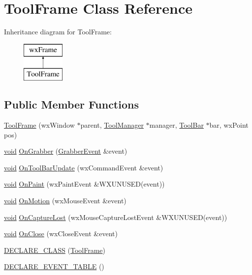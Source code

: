 \hypertarget{class_tool_frame}{}\section{Tool\+Frame Class Reference}
\label{class_tool_frame}
Inheritance diagram for Tool\+Frame\+:\begin{figure}[H]
\begin{center}
\leavevmode
\includegraphics[height=2.000000cm]{class_tool_frame}
\end{center}
\end{figure}
\subsection*{Public Member Functions}
\begin{DoxyCompactItemize}
\item 
\hyperlink{class_tool_frame_a4c897b2a42bbbea14ccd97e038a3283a}{Tool\+Frame} (wx\+Window $\ast$parent, \hyperlink{class_tool_manager}{Tool\+Manager} $\ast$manager, \hyperlink{class_tool_bar}{Tool\+Bar} $\ast$bar, wx\+Point pos)
\item 
\hyperlink{sound_8c_ae35f5844602719cf66324f4de2a658b3}{void} \hyperlink{class_tool_frame_ac08de1b85e3c42fd3f61ed39139256af}{On\+Grabber} (\hyperlink{class_grabber_event}{Grabber\+Event} \&event)
\item 
\hyperlink{sound_8c_ae35f5844602719cf66324f4de2a658b3}{void} \hyperlink{class_tool_frame_af4dc5726e65651cf4be62a5882a3df09}{On\+Tool\+Bar\+Update} (wx\+Command\+Event \&event)
\item 
\hyperlink{sound_8c_ae35f5844602719cf66324f4de2a658b3}{void} \hyperlink{class_tool_frame_ac2f92b49db1a0838f3e9049e0c97c475}{On\+Paint} (wx\+Paint\+Event \&W\+X\+U\+N\+U\+S\+ED(event))
\item 
\hyperlink{sound_8c_ae35f5844602719cf66324f4de2a658b3}{void} \hyperlink{class_tool_frame_a44a7e8210c3107234911812cd27870ee}{On\+Motion} (wx\+Mouse\+Event \&event)
\item 
\hyperlink{sound_8c_ae35f5844602719cf66324f4de2a658b3}{void} \hyperlink{class_tool_frame_ae0bf3f98fd0eeea8899b415180e04e78}{On\+Capture\+Lost} (wx\+Mouse\+Capture\+Lost\+Event \&W\+X\+U\+N\+U\+S\+ED(event))
\item 
\hyperlink{sound_8c_ae35f5844602719cf66324f4de2a658b3}{void} \hyperlink{class_tool_frame_a7392d305e68be67d51f1563777c12015}{On\+Close} (wx\+Close\+Event \&event)
\item 
\hyperlink{class_tool_frame_abde8600a1c4af31cb3b06ff24990b02d}{D\+E\+C\+L\+A\+R\+E\+\_\+\+C\+L\+A\+SS} (\hyperlink{class_tool_frame}{Tool\+Frame})
\item 
\hyperlink{class_tool_frame_ac5c3291d2226709f84dd79eed6a342a8}{D\+E\+C\+L\+A\+R\+E\+\_\+\+E\+V\+E\+N\+T\+\_\+\+T\+A\+B\+LE} ()
\end{DoxyCompactItemize}


